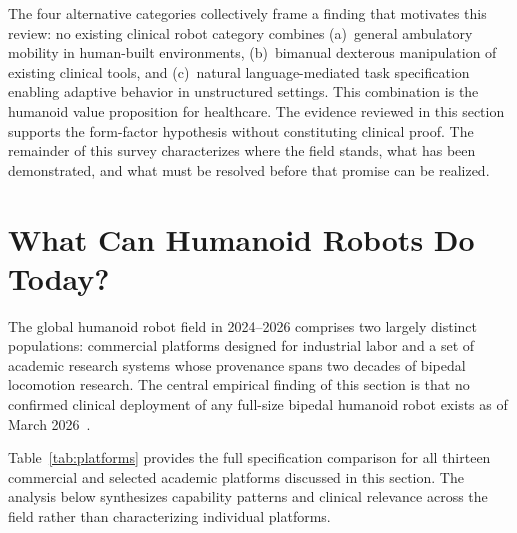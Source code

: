\documentclass[acmsmall]{acmart}
\begin{document}
The four alternative categories collectively frame a finding that motivates this
review: no existing clinical robot category combines (a)~general ambulatory
mobility in human-built environments, (b)~bimanual dexterous manipulation of
existing clinical tools, and (c)~natural language-mediated task specification
enabling adaptive behavior in unstructured settings. This combination is the
humanoid value proposition for healthcare. The evidence reviewed in this section
supports the form-factor hypothesis without constituting clinical proof. The
remainder of this survey characterizes where the field stands, what has been
demonstrated, and what must be resolved before that promise can be realized.

\section{What Can Humanoid Robots Do Today?}
\label{sec:systems}

The global humanoid robot field in 2024--2026 comprises two largely distinct
populations: commercial platforms designed for industrial labor and a set of
academic research systems whose provenance spans two decades of bipedal
locomotion research. The central empirical finding of this section is that no
confirmed clinical deployment of any full-size bipedal humanoid robot exists as
of March 2026~\cite{atar2025humanoids,cho2026humanoid,cunha2025humanoid}.

Table~\ref{tab:platforms} provides the full specification comparison for all
thirteen commercial and selected academic platforms discussed in this section.
The analysis below synthesizes capability patterns and clinical relevance across
the field rather than characterizing individual platforms.
\end{document}
